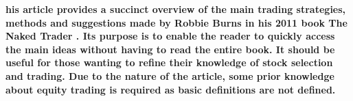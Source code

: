 \textbf{his article provides a succinct overview of the main trading strategies, methods and suggestions made by Robbie Burns in his 2011 book The Naked Trader \cite{burns2011}. Its purpose is to enable the reader to quickly access the main ideas without having to read the entire book. It should be useful for those wanting to refine their knowledge of stock selection and trading. Due to the nature of the article, some prior knowledge about equity trading is required as basic definitions are not defined.} 
